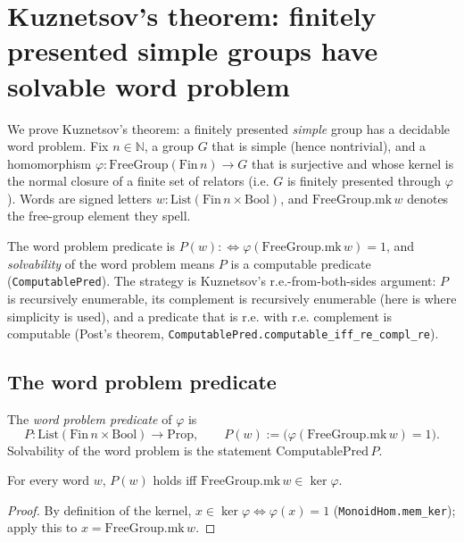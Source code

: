 


\section{Kuznetsov's theorem: finitely presented simple groups have solvable word problem}

We prove Kuznetsov's theorem: a finitely presented \emph{simple} group has a
decidable word problem. Fix $n \in \mathbb{N}$, a group $G$ that is simple
(hence nontrivial), and a homomorphism $\varphi : \mathrm{FreeGroup}(\mathrm{Fin}\,n)
\to G$ that is surjective and whose kernel is the normal closure of a finite set
of relators (i.e. $G$ is finitely presented through $\varphi$). Words are signed
letters $w : \mathrm{List}(\mathrm{Fin}\,n \times \mathrm{Bool})$, and
$\mathrm{FreeGroup.mk}\,w$ denotes the free-group element they spell.

The word problem predicate is $P(w) :\Leftrightarrow \varphi(\mathrm{FreeGroup.mk}\,w) = 1$,
and \emph{solvability} of the word problem means $P$ is a computable predicate
(\texttt{ComputablePred}). The strategy is Kuznetsov's r.e.-from-both-sides
argument: $P$ is recursively enumerable, its complement is recursively enumerable
(here is where simplicity is used), and a predicate that is r.e. with r.e.
complement is computable (Post's theorem, \texttt{ComputablePred.computable\_iff\_re\_compl\_re}).

\subsection{The word problem predicate}

\begin{definition}
    \label{def:word-pred}
    The \emph{word problem predicate} of $\varphi$ is
    \[
        P : \mathrm{List}(\mathrm{Fin}\,n \times \mathrm{Bool}) \to \mathrm{Prop},
        \qquad P(w) := \bigl(\varphi(\mathrm{FreeGroup.mk}\,w) = 1\bigr).
    \]
    Solvability of the word problem is the statement
    $\mathrm{ComputablePred}\,P$.
\end{definition}

\begin{lemma}
    \label{lem:pred-iff-mem-ker}
    \leanok
    For every word $w$, $P(w)$ holds iff
    $\mathrm{FreeGroup.mk}\,w \in \ker\varphi$.
\end{lemma}
\begin{proof}
    By definition of the kernel, $x \in \ker\varphi \Leftrightarrow \varphi(x) = 1$
    (\texttt{MonoidHom.mem\_ker}); apply this to $x = \mathrm{FreeGroup.mk}\,w$.
\end{proof}

